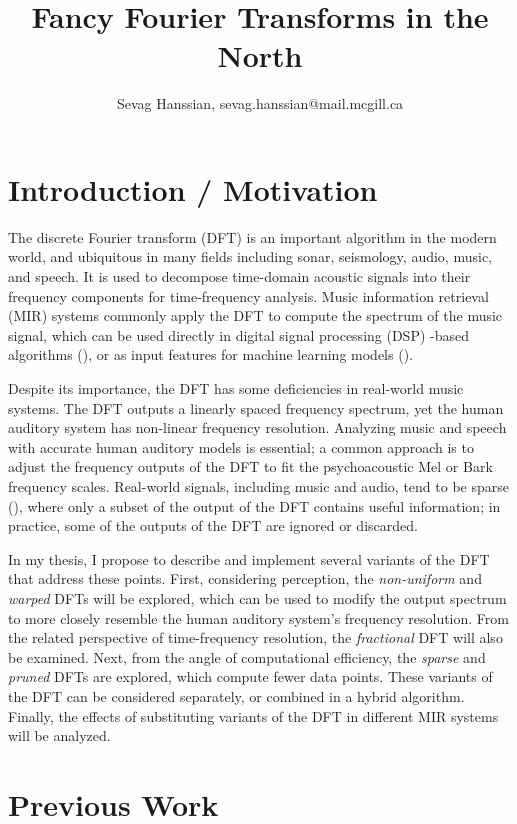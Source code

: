 \documentclass[letter,12pt]{scrartcl}
\title{Fancy Fourier Transforms in the North}
\author{Sevag Hanssian, sevag.hanssian@mail.mcgill.ca}
\begin{document}
\maketitle

\section{Introduction / Motivation}

The discrete Fourier transform (DFT) is an important algorithm in the modern world, and ubiquitous in many fields including sonar, seismology, audio, music, and speech. It is used to decompose time-domain acoustic signals into their frequency components for time-frequency analysis. Music information retrieval (MIR) systems commonly apply the DFT to compute the spectrum of the music signal, which can be used directly in digital signal processing (DSP) -based algorithms (\cite{fitzgerald}), or as input features for machine learning models (\cite{musicnn1}).

Despite its importance, the DFT has some deficiencies in real-world music systems. The DFT outputs a linearly spaced frequency spectrum, yet the human auditory system has non-linear frequency resolution. Analyzing music and speech with accurate human auditory models is essential; a common approach is to adjust the frequency outputs of the DFT to fit the psychoacoustic Mel or Bark frequency scales. Real-world signals, including music and audio, tend to be sparse (\cite{sparse}), where only a subset of the output of the DFT contains useful information; in practice, some of the outputs of the DFT are ignored or discarded.

In my thesis, I propose to describe and implement several variants of the DFT that address these points. First, considering perception, the \textit{non-uniform} and \textit{warped} DFTs will be explored, which can be used to modify the output spectrum to more closely resemble the human auditory system's frequency resolution. From the related perspective of time-frequency resolution, the \textit{fractional} DFT will also be examined. Next, from the angle of computational efficiency, the \textit{sparse} and \textit{pruned} DFTs are explored, which compute fewer data points. These variants of the DFT can be considered separately, or combined in a hybrid algorithm. Finally, the effects of substituting variants of the DFT in different MIR systems will be analyzed.

\section{Previous Work}
\end{document}
